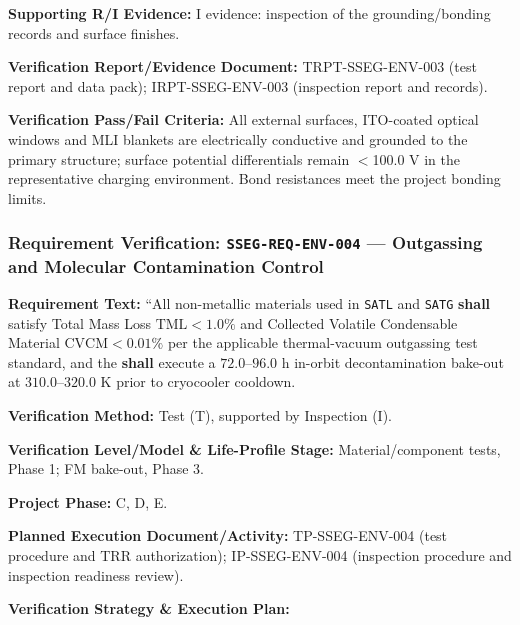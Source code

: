 \par\textbf{Supporting R/I Evidence:} I evidence: inspection of the grounding/bonding records and surface finishes.
\par\textbf{Verification Report/Evidence Document:} TRPT-SSEG-ENV-003 (test report and data pack); IRPT-SSEG-ENV-003 (inspection report and records).
\par\textbf{Verification Pass/Fail Criteria:} All external surfaces, ITO-coated optical windows and MLI blankets are electrically conductive and grounded to the primary structure; surface potential differentials remain $<$100.0 V in the representative charging environment. Bond resistances meet the project bonding limits.
\par\medskip
\subsubsection{Requirement Verification: \texttt{SSEG-REQ-ENV-004} --- Outgassing and Molecular Contamination Control}
\label{ver:SSEG-REQ-ENV-004}
\textbf{Requirement Text:} ``All non-metallic materials used in \texttt{SATL} and \texttt{SATG} \textbf{shall} satisfy Total Mass Loss $\mathrm{TML} < 1.0\%$ and Collected Volatile Condensable Material $\mathrm{CVCM} < 0.01\%$ per the applicable thermal-vacuum outgassing test standard, and the  \textbf{shall} execute a $72.0\text{--}96.0\text{ h}$ in-orbit decontamination bake-out at $310.0\text{--}320.0\text{ K}$ prior to cryocooler cooldown.
\par\textbf{Verification Method:} Test (T), supported by Inspection (I).
\par\textbf{Verification Level/Model \& Life-Profile Stage:} Material/component tests, Phase 1; FM bake-out, Phase 3.
\par\textbf{Project Phase:} C, D, E.
\par\textbf{Planned Execution Document/Activity:} TP-SSEG-ENV-004 (test procedure and TRR authorization); IP-SSEG-ENV-004 (inspection procedure and inspection readiness review).
\par\textbf{Verification Strategy \& Execution Plan:}
